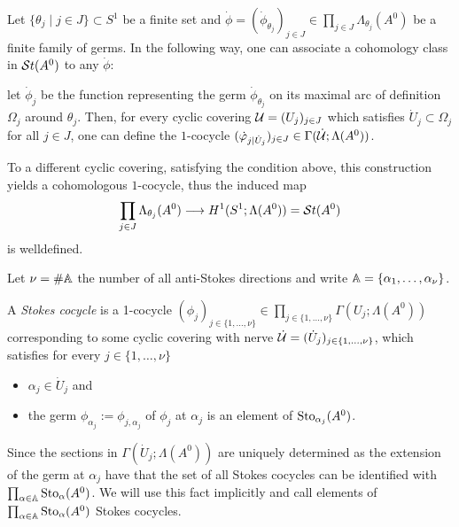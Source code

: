 \begin{rem}\label{rem:mapStoToCocy}
  Let $\{\theta_j\mid j\in J\}\subset S^1$ be a finite set and
  $\dot\phi=(\dot\phi_{\theta_j})_{j\in J}
  \in\prod_{j\in J}\Lambda_{\theta_j}(A^0)$ be a finite family of germs.
  In the following way, one can associate a cohomology class in $\mathcal{S}{}t(A^0)$ to
  any $\dot\phi$:
  \begin{einr}
    let $\dot\phi_j$ be the function representing the germ
    $\dot\phi_{\theta_j}$ on its maximal arc of definition $\Omega_j$ around
    $\theta_j$.
    Then, for every cyclic covering $\mathcal{U}=(U_j)_{j\in J}$ which satisfies
    $\dot U_j\subset \Omega_j$ for all $j\in J$, one can define the $1$-cocycle
    $(\dot{\varphi}_{j|\dot U_j})_{j\in J}\in\Gamma(\dot{\mathcal{U}};\Lambda(A^0))$.
  \end{einr}
  To a different cyclic covering, satisfying the condition above, this
  construction yields a cohomologous $1$-cocycle, thus the induced map
  \[
    \prod_{j\in J}\Lambda_{\theta_j}(A^0)
    \longrightarrow
    H^1(S^1;\Lambda(A^0))=\mathcal{S}{}t(A^0)
  \]
  is welldefined.
  \begin{comment}
    \begin{s-rem}
      Let $\dot\phi=(\dot\phi_{\theta})\in\Lambda_\theta(A^0)$ be a cocycle
      consisting only of an single element, which satisfies that the maximal
      arc of definition $\theta$ has opening less than $2\pi$.
      There can not exist a covering consisting of a single element $U$
      satisfying $U\subset\Omega$ and thus no map \dots
    \end{s-rem}
  \end{comment}
\end{rem}
\begin{defn}\label{defn:stokesCocycle}
  Let $\nu=\#\mathbb{A}$ the number of all anti-Stokes directions and write
  $\mathbb{A}=\{\alpha_1,\dots,\alpha_\nu\}$.

  A \emph{Stokes cocycle} is a 1-cocycle $(\phi_j)_{j\in\{1,\dots,\nu\}}\in
  \prod_{j\in\{1,\dots,\nu\}}\Gamma(U_j;\Lambda(A^0))$ corresponding to some
  cyclic covering with nerve $\dot{\mathcal{U}}=(\dot U_j)_{j\in\{1,\dots,\nu\}}$,
  which satisfies for every $j\in\{1,\dots,\nu\}$
  \begin{itemize}
    \item $\alpha_j\in\dot U_j$ and
    \item the germ $\phi_{\alpha_j}:=\phi_{j,\alpha_j}$ of $\phi_j$ at
      $\alpha_j$ is an element of $\operatorname{Sto}_{\alpha_j}(A^0)$.
  \end{itemize}
  \begin{s-rem}
    Since the sections in $\Gamma(\dot U_j;\Lambda(A^0))$ are uniquely
    determined as the extension of the germ at $\alpha_j$ have that the set of
    all Stokes cocycles can be identified with
    $\prod_{\alpha\in\mathbb{A}}\operatorname{Sto}_\alpha(A^0)$. We will use this fact implicitly and
    call elements of $\prod_{\alpha\in\mathbb{A}}\operatorname{Sto}_\alpha(A^0)$ Stokes cocycles.
  \end{s-rem}
\end{defn}
